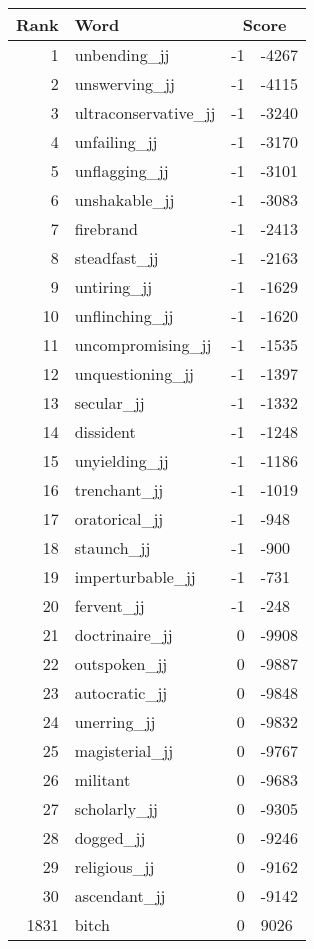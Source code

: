 \begin{longtable}[!htbp]{| rlr@{.}l |}
    \hline
    \textbf{Rank} & \textbf{Word} & \multicolumn{2}{c|}{\textbf{Score}} \\
    \hline
    \endhead
    1 & unbending\_jj & -1 & -4267 \\
    2 & unswerving\_jj & -1 & -4115 \\
    3 & ultraconservative\_jj & -1 & -3240 \\
    4 & unfailing\_jj & -1 & -3170 \\
    5 & unflagging\_jj & -1 & -3101 \\
    6 & unshakable\_jj & -1 & -3083 \\
    7 & firebrand & -1 & -2413 \\
    8 & steadfast\_jj & -1 & -2163 \\
    9 & untiring\_jj & -1 & -1629 \\
    10 & unflinching\_jj & -1 & -1620 \\
    11 & uncompromising\_jj & -1 & -1535 \\
    12 & unquestioning\_jj & -1 & -1397 \\
    13 & secular\_jj & -1 & -1332 \\
    14 & dissident & -1 & -1248 \\
    15 & unyielding\_jj & -1 & -1186 \\
    16 & trenchant\_jj & -1 & -1019 \\
    17 & oratorical\_jj & -1 & -948 \\
    18 & staunch\_jj & -1 & -900 \\
    19 & imperturbable\_jj & -1 & -731 \\
    20 & fervent\_jj & -1 & -248 \\
    21 & doctrinaire\_jj & 0 & -9908 \\
    22 & outspoken\_jj & 0 & -9887 \\
    23 & autocratic\_jj & 0 & -9848 \\
    24 & unerring\_jj & 0 & -9832 \\
    25 & magisterial\_jj & 0 & -9767 \\
    26 & militant & 0 & -9683 \\
    27 & scholarly\_jj & 0 & -9305 \\
    28 & dogged\_jj & 0 & -9246 \\
    29 & religious\_jj & 0 & -9162 \\
    30 & ascendant\_jj & 0 & -9142 \\
    1831 & bitch & 0 & 9026 \\

\end{longtable}
